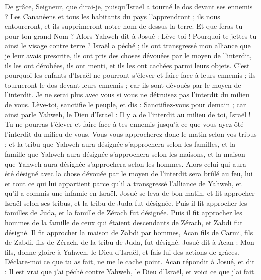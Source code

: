 \begin{multicols}{2}
De grâce, Seigneur, que dirai-je, puisqu’Israël a tourné le dos devant ses ennemis ?
Les Cananéens et tous les habitants du pays l’apprendront ; ils nous entoureront, et ils supprimeront notre nom de dessus la terre. Et que feras-tu pour ton grand Nom ?
Alors Yahweh dit à Josué : Lève-toi ! Pourquoi te jettes-tu ainsi le visage contre terre ?
Israël a péché ; ils ont transgressé mon alliance que je leur avais prescrite, ils ont pris des choses dévouées par le moyen de l'interdit, ils les ont dérobées, ils ont menti, et ils les ont cachées parmi leurs objets.
C’est pourquoi les enfants d’Israël ne pourront s’élever et faire face à leurs ennemis ; ils tourneront le dos devant leurs ennemis ; car ils sont dévoués par le moyen de l'interdit. Je ne serai plus avec vous si vous ne détruisez pas l’interdit du milieu de vous.
Lève-toi, sanctifie le peuple, et dis : Sanctifiez-vous pour demain ; car ainsi parle Yahweh, le Dieu d’Israël : Il y a de l’interdit au milieu de toi, Israël ! Tu ne pourras t’élever et faire face à tes ennemis jusqu’à ce que vous ayez ôté l’interdit du milieu de vous.
Vous vous approcherez donc le matin selon vos tribus ; et la tribu que Yahweh aura désignée s’approchera selon les familles, et la famille que Yahweh aura désignée s’approchera selon les maisons, et la maison que Yahweh aura désignée s’approchera selon les hommes.
Alors celui qui aura été désigné avec la chose dévouée par le moyen de l'interdit sera brûlé au feu, lui et tout ce qui lui appartient parce qu’il a transgressé l’alliance de Yahweh, et qu’il a commis une infamie en Israël.
Josué se leva de bon matin, et fit approcher Israël selon ses tribus, et la tribu de Juda fut désignée.
Puis il fit approcher les familles de Juda, et la famille de Zérach fut désignée. Puis il fit approcher les hommes de la famille de ceux qui étaient descendants de Zérach, et Zabdi fut désigné.
Il fit approcher la maison de Zabdi par hommes, Acan fils de Carmi, fils de Zabdi, fils de Zérach, de la tribu de Juda, fut désigné.
Josué dit à Acan : Mon fils, donne gloire à Yahweh, le Dieu d’Israël, et fais-lui des actions de grâces. Déclare-moi ce que tu as fait, ne me le cache point.
Acan répondit à Josué, et dit : Il est vrai que j’ai péché contre Yahweh, le Dieu d’Israël, et voici ce que j’ai fait.

\end{multicols}
